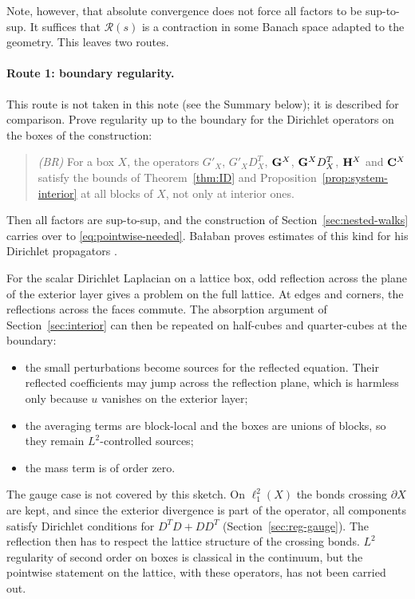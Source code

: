 Note, however, that absolute convergence does not force all factors to be sup-to-sup. It suffices that $\mathcal R(s)$ is a contraction in some Banach space adapted to the geometry. This leaves two routes.

\paragraph{Route 1: boundary regularity.} This route is not taken in this note (see the Summary below); it is described for comparison. Prove regularity up to the boundary for the Dirichlet operators on the boxes of the construction:
\begin{quote}
\emph{(BR)} For a box $X$, the operators $G'_X$, $G'_XD^T_X$, $\mathbf G^X$, $\mathbf G^XD^T_X$, $\mathbf H^X$ and $\mathbf C^X$ satisfy the bounds of Theorem~\ref{thm:ID} and Proposition~\ref{prop:system-interior} at all blocks of $X$, not only at interior ones.
\end{quote}
Then all factors are sup-to-sup, and the construction of Section~\ref{sec:nested-walks} carries over to \eqref{eq:pointwise-needed}. Ba\l aban proves estimates of this kind for his Dirichlet propagators \cite{BalGreen,BalPropI,BalBackground}.

For the scalar Dirichlet Laplacian on a lattice box, odd reflection across the plane of the exterior layer gives a problem on the full lattice. At edges and corners, the reflections across the faces commute. The absorption argument of Section~\ref{sec:interior} can then be repeated on half-cubes and quarter-cubes at the boundary:
\begin{itemize}
\item the small perturbations become sources for the reflected equation. Their reflected coefficients may jump across the reflection plane, which is harmless only because $u$ vanishes on the exterior layer;
\item the averaging terms are block-local and the boxes are unions of blocks, so they remain $L^2$-controlled sources;
\item the mass term is of order zero.
\end{itemize}
The gauge case is not covered by this sketch. On $\ell^2_1(X)$ the bonds crossing $\partial X$ are kept, and since the exterior divergence is part of the operator, all components satisfy Dirichlet conditions for $D^TD+DD^T$ (Section~\ref{sec:reg-gauge}). The reflection then has to respect the lattice structure of the crossing bonds. $L^2$ regularity of second order on boxes is classical in the continuum, but the pointwise statement on the lattice, with these operators, has not been carried out.

